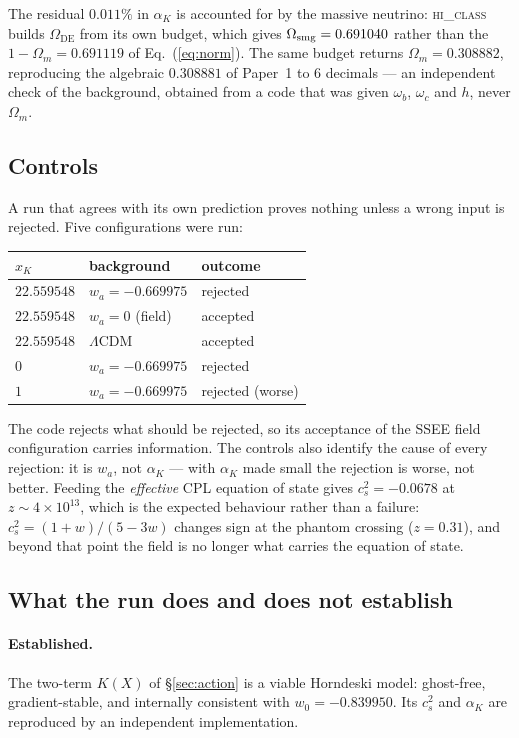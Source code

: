 \documentclass[12pt,a4paper]{article}
\newcommand{\Omde}{\Omega_{\mathrm{DE}}}
\newcommand{\Omm}{\Omega_{m}}
\begin{document}
The residual $0.011\%$ in $\alpha_K$ is accounted for by the massive
neutrino: \textsc{hi\_class} builds $\Omde$ from its own budget, which
gives $\Omega_{\rm smg} = 0.691040$ rather than the $1-\Omm = 0.691119$
of Eq.~(\ref{eq:norm}).  The same budget returns
$\Omm = 0.308882$, reproducing the algebraic $0.308881$ of Paper~1 to
$6$ decimals --- an independent check of the background, obtained from a
code that was given $\omega_b$, $\omega_c$ and $h$, never $\Omm$.

\subsection{Controls}

A run that agrees with its own prediction proves nothing unless a wrong
input is rejected.  Five configurations were run:

\begin{center}
\begin{tabular}{lll}
\toprule
$x_K$ & background & outcome \\
\midrule
$22.559548$ & $w_a = -0.669975$ & rejected \\
$22.559548$ & $w_a = 0$ (field)  & accepted \\
$22.559548$ & $\Lambda$CDM      & accepted \\
$0$         & $w_a = -0.669975$ & rejected \\
$1$         & $w_a = -0.669975$ & rejected (worse) \\
\bottomrule
\end{tabular}
\end{center}

The code rejects what should be rejected, so its acceptance of the SSEE
field configuration carries information.  The controls also identify the
cause of every rejection: it is $w_a$, not $\alpha_K$ --- with
$\alpha_K$ made small the rejection is worse, not better.  Feeding the
\emph{effective} CPL equation of state gives $c_s^2 = -0.0678$ at
$z \sim 4\times10^{13}$, which is the expected behaviour rather than a
failure: $c_s^2 = (1+w)/(5-3w)$ changes sign at the phantom crossing
($z = 0.31$), and beyond that point the field is no longer what carries
the equation of state.

\subsection{What the run does and does not establish}

\paragraph{Established.}
The two-term $K(X)$ of §\ref{sec:action} is a viable Horndeski model:
ghost-free, gradient-stable, and internally consistent with
$w_0 = -0.839950$.  Its $c_s^2$ and $\alpha_K$ are reproduced by an
independent implementation.
\end{document}
